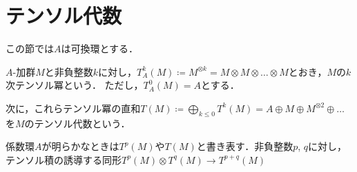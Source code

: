 \section{テンソル代数}
この節では\(A\)は可換環とする．
\begin{defi}
\(A\)-加群\(M\)と非負整数\(k\)に対し，\(T_A^k(M)\coloneqq M^{\otimes k}=M\otimes M\otimes\dots\otimes M\)とおき，\(M\)の\(k\)次テンソル冪という．
ただし，\(T_A^0(M)=A\)とする．

次に，これらテンソル冪の直和\(T(M)\coloneqq \bigoplus_{k\leq0}T^k(M)=A\oplus M\oplus M^{\otimes2}\oplus\dots\)を\(M\)のテンソル代数という．
\end{defi}
係数環\(A\)が明らかなときは\(T^p(M)\)や\(T(M)\)と書き表す．非負整数\(p\), \(q\)に対し，テンソル積の誘導する同形\(T^p(M)\otimes T^q(M)\to T^{p+q}(M)\)
